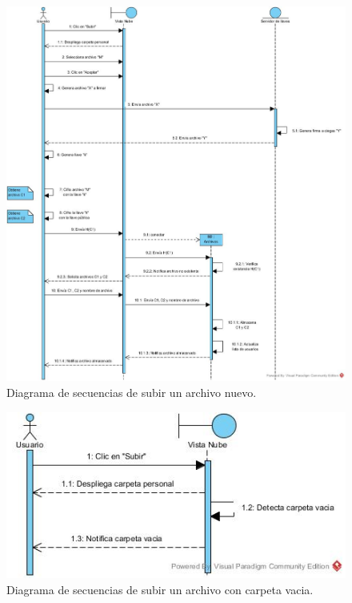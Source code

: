 \begin{figure}[htbp!]
		\centering
			\includegraphics[width=1\textwidth]{images/Subir_Archivo}
		\caption{Diagrama de secuencias de subir un archivo nuevo.}
\end{figure}

\begin{figure}[htbp!]
		\centering
			\includegraphics[width=1\textwidth]{images/Subir_trayectoria_a}
		\caption{Diagrama de secuencias de subir un archivo con carpeta vacia.}
\end{figure}

